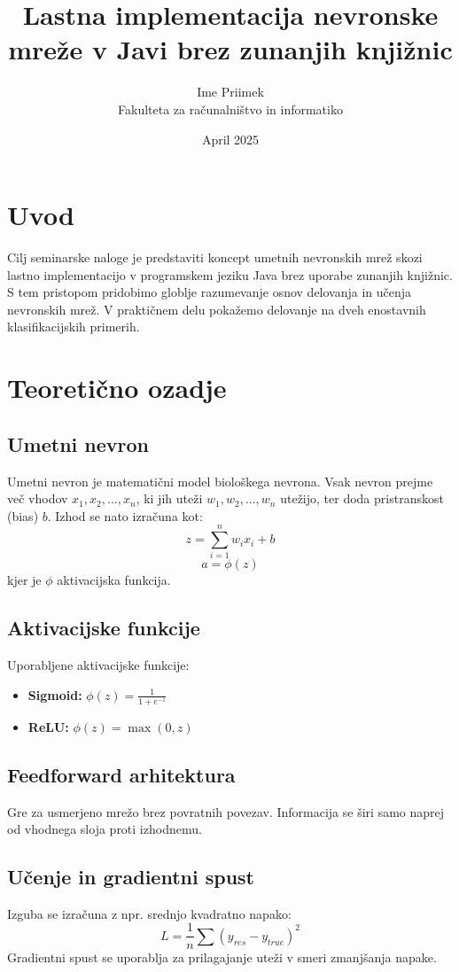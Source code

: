 \documentclass[12pt,a4paper]{article}
\title{Lastna implementacija nevronske mreže v Javi brez zunanjih knjižnic}
\author{Ime Priimek \\ Fakulteta za računalništvo in informatiko}
\date{April 2025}
\begin{document}
\maketitle
\tableofcontents
\newpage

\section{Uvod}
Cilj seminarske naloge je predstaviti koncept umetnih nevronskih mrež skozi lastno implementacijo v programskem jeziku Java brez uporabe zunanjih knjižnic. S tem pristopom pridobimo globlje razumevanje osnov delovanja in učenja nevronskih mrež. V praktičnem delu pokažemo delovanje na dveh enostavnih klasifikacijskih primerih.

\section{Teoretično ozadje}
\subsection{Umetni nevron}
Umetni nevron je matematični model biološkega nevrona. Vsak nevron prejme več vhodov $x_1, x_2, ..., x_n$, ki jih uteži $w_1, w_2, ..., w_n$ utežijo, ter doda pristranskost (bias) $b$. Izhod se nato izračuna kot:
\[
z = \sum_{i=1}^n w_i x_i + b
\]
\[
a = \phi(z)
\]
kjer je $\phi$ aktivacijska funkcija.

\subsection{Aktivacijske funkcije}
Uporabljene aktivacijske funkcije:
\begin{itemize}
    \item \textbf{Sigmoid:} $\phi(z) = \frac{1}{1 + e^{-z}}$
    \item \textbf{ReLU:} $\phi(z) = \max(0, z)$
\end{itemize}

\subsection{Feedforward arhitektura}
Gre za usmerjeno mrežo brez povratnih povezav. Informacija se širi samo naprej od vhodnega sloja proti izhodnemu.

\subsection{Učenje in gradientni spust}
Izguba se izračuna z npr. srednjo kvadratno napako:
\[
L = \frac{1}{n} \sum (y_{res} - y_{true})^2
\]
Gradientni spust se uporablja za prilagajanje uteži v smeri zmanjšanja napake.
\end{document}
